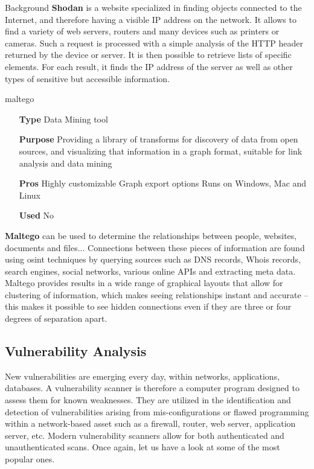 \begin{chaptercover}{Background}
\textbf{Shodan} \cite{shodan} is a website specialized in finding objects connected to the Internet, and therefore having a visible IP address on the network. It allows to find a variety of web servers, routers and many devices such as printers or cameras. Such a request is processed with a simple analysis of the HTTP header returned by the device or server. It is then possible to retrieve lists of specific elements. For each result, it finds the IP address of the server as well as other types of sensitive but accessible information.

\begin{solutiondata}{maltego}
\begin{itemize}[labelsep=1cm]
  \item [\textbf{Type}] Data Mining tool
  \item [\textbf{Purpose}] Providing a library of transforms for discovery of data from open sources, and visualizing that information in a graph format, suitable for link analysis and data mining
  \item [\textbf{Pros}] Highly customizable \newline Graph export options \newline Runs on Windows, Mac and Linux
  \item [\textbf{Used}] No
\end{itemize}
\end{solutiondata}

\textbf{Maltego} \cite{maltego} can be used to determine the relationships between people, websites, documents and files... Connections between these pieces of information are found using \acrfull{osint} techniques by querying sources such as DNS records, Whois records, search engines, social networks, various online APIs and extracting meta data. Maltego provides results in a wide range of graphical layouts that allow for clustering of information, which makes seeing relationships instant and accurate – this makes it possible to see hidden connections even if they are three or four degrees of separation apart.

\subsection{Vulnerability Analysis}

New vulnerabilities are emerging every day, within networks, applications, databases. A vulnerability scanner is therefore a computer program designed to assess them for known weaknesses. They are utilized in the identification and detection of vulnerabilities arising from mis-configurations or flawed programming within a network-based asset such as a firewall, router, web server, application server, etc. Modern vulnerability scanners allow for both authenticated and unauthenticated scans. Once again, let us have a look at some of the most popular ones.


\end{chaptercover}

